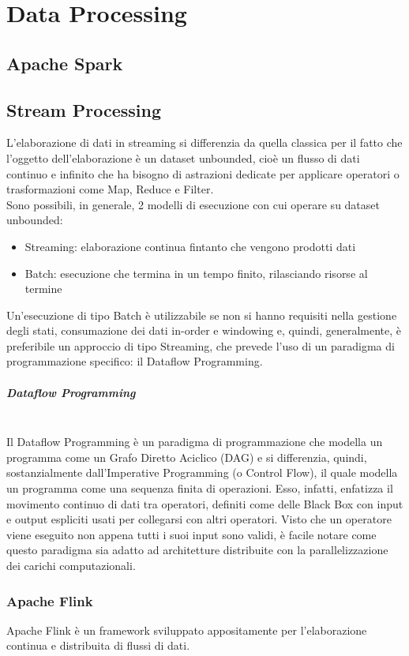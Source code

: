 \chapter{Data Processing}

\section{Apache Spark} \label{Spark}

\section{Stream Processing} \label{StreamProc}

L'elaborazione di dati in streaming si differenzia da quella classica per il fatto che l'oggetto dell'elaborazione è un dataset unbounded, cioè un flusso di dati continuo e infinito che ha bisogno di astrazioni dedicate per applicare operatori o trasformazioni come Map, Reduce e Filter. \\

Sono possibili, in generale, 2 modelli di esecuzione con cui operare su dataset unbounded:

\begin{itemize}
	\item Streaming: elaborazione continua fintanto che vengono prodotti dati
	\item Batch: esecuzione che termina in un tempo finito, rilasciando risorse al termine
\end{itemize}

Un'esecuzione di tipo Batch è utilizzabile se non si hanno requisiti nella gestione degli stati, consumazione dei dati in-order e windowing e, quindi, generalmente, è preferibile un approccio di tipo Streaming, che prevede l'uso di un paradigma di programmazione specifico: il Dataflow Programming.

\paragraph{Dataflow Programming}  \label{DataflowProg} ~\\

Il Dataflow Programming è un paradigma di programmazione che modella un programma come un Grafo Diretto Aciclico (DAG) e si differenzia, quindi, sostanzialmente dall'Imperative Programming (o Control Flow), il quale modella un programma come una sequenza finita di operazioni. Esso, infatti, enfatizza il movimento continuo di dati tra operatori, definiti come delle Black Box con input e output espliciti usati per collegarsi con altri operatori. Visto che un operatore viene eseguito non appena tutti i suoi input sono validi, è facile notare come questo paradigma sia adatto ad architetture distribuite con la parallelizzazione dei carichi computazionali.


\subsection{Apache Flink}\label{Flink}

Apache Flink è un framework sviluppato appositamente per l'elaborazione continua e distribuita di flussi di dati. 